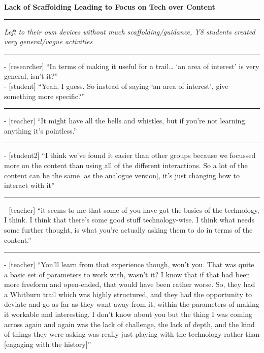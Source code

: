 \textbf{Lack of Scaffolding Leading to Focus on Tech over Content}

\par\noindent\rule{\textwidth}{1pt}

\textit{Left to their own devices without much scaffolding/guidance, Y8 students created very general/vague activities}

\par\noindent\rule{\textwidth}{1pt}

- [researcher] “In terms of making it useful for a trail… ‘an area of interest’ is very general, isn’t it?”\\
- [student] “Yeah, I guess. So instead of saying ‘an area of interest’, give something more specific?”

{\centering
  \noindent\rule{0.5\textwidth}{0.4pt}\par
}

- [teacher] “It might have all the bells and whistles, but if you’re not learning anything it’s pointless.”

{\centering
  \noindent\rule{0.5\textwidth}{0.4pt}\par
}

- [student2] “I think we’ve found it easier than other groups because we focussed more on the content than using all of the different interactions. So a lot of the content can be the same [as the analogue version], it’s just changing how to interact with it”

{\centering
  \noindent\rule{0.5\textwidth}{0.4pt}\par
}

- [teacher] “it seems to me that some of you have got the basics of the technology, I think. I think that there’s some good stuff technology-wise. I think what needs some further thought, is what you’re actually asking them to do in terms of the content.”

{\centering
  \noindent\rule{0.5\textwidth}{0.4pt}\par
}

- [teacher] “You’ll learn from that experience though, won’t you. That was quite a basic set of parameters to work with, wasn’t it? I know that if that had been more freeform and open-ended, that would have been rather worse. So, they had a Whitburn trail which was highly structured, and they had the opportunity to deviate and go as far as they want away from it, within the parameters of making it workable and interesting. I don’t know about you but the thing I was coming across again and again was the lack of challenge, the lack of depth, and the kind of things they were asking was really just playing with the technology rather than [engaging with the history]”

